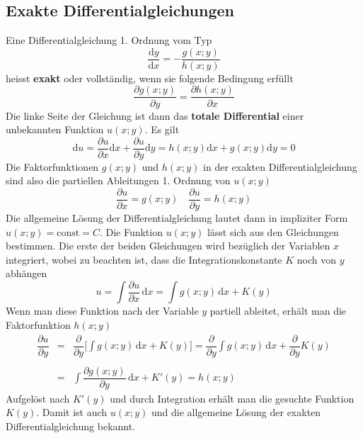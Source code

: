 \subsection{Exakte Differentialgleichungen}
Eine Differentialgleichung 1. Ordnung vom Typ
\begin{equation}
\boxed{\dfrac{\text{d}y}{\text{d}x}=-\dfrac{g\left(x; y\right)}{h\left(x; y\right)}}
\end{equation}
heisst \textbf{exakt} oder vollständig, wenn sie folgende Bedingung erfüllt
\begin{equation}
\boxed{\dfrac{\partial g\left(x; y\right)}{\partial y}=\dfrac{\partial h\left(x; y\right)}{\partial x}}
\end{equation}
Die linke Seite der Gleichung ist dann das \textbf{totale Differential} einer unbekannten Funktion $u\left(x; y\right)$. Es gilt
\begin{equation}
\boxed{\text{d}u=\dfrac{\partial u}{\partial x}\text{d}x+\dfrac{\partial u}{\partial y}\text{d}y=h\left(x; y\right)\text{d}x+g\left(x; y\right)\text{d}y=0}
\end{equation}
Die Faktorfunktionen $g\left(x; y\right)$ und $h\left(x; y\right)$ in der exakten Differentialgleichung sind also die partiellen Ableitungen 1. Ordnung von $u\left(x; y\right)$
\begin{equation}
\boxed{\dfrac{\partial u}{\partial x}=g\left(x; y\right)}\quad \boxed{\dfrac{\partial u}{\partial y}=h\left(x; y\right)}
\end{equation}
Die allgemeine Lösung der Differentialgleichung lautet dann in impliziter Form $u\left(x; y\right)=\text{const}=C$. Die Funktion $u\left(x; y\right)$ lässt sich aus den Gleichungen bestimmen. Die erste der beiden Gleichungen wird bezüglich der Variablen $x$ integriert, wobei zu beachten ist, dass die Integrationskonstante $K$ noch von $y$ abhängen
\begin{equation}
\boxed{u=\displaystyle \int \dfrac{\partial u}{\partial x}\,\text{d}x=\displaystyle \int g\left(x; y\right)\,\text{d}x+K\left(y\right)}
\end{equation}
Wenn man diese Funktion nach der Variable $y$ partiell ableitet, erhält man die Faktorfunktion $h\left(x; y\right)$
\begin{equation}
\boxed{
\begin{array}{lll}
\dfrac{\partial u}{\partial y}&=&\dfrac{\partial}{\partial y}\Big[\displaystyle \int g\left(x; y\right)\,\text{d}x+K\left(y\right)\Big]=\dfrac{\partial}{\partial y}\displaystyle \int g\left(x; y\right)\,\text{d}x+\dfrac{\partial}{\partial y}K\left(y\right)\\\\
&=&\displaystyle \int \dfrac{\partial g\left(x; y\right)}{\partial y}\,\text{d}x+K'\left(y\right)=h\left(x; y\right)
\end{array}
}
\end{equation}
Aufgelöst nach $K'\left(y\right)$ und durch Integration erhält man die gesuchte Funktion $K\left(y\right)$. Damit ist auch $u\left(x; y\right)$ und die allgemeine Lösung der exakten Differentialgleichung bekannt.
